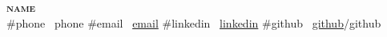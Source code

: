 \begin{center}
    \textbf{\Huge \scshape {{name}}} \\ \vspace{3pt}
    {{#phone}} \ \small {{phone}} 
    {{#email}} \ \href{mailto:{{email}}}{\small {{email}}} 
    {{#linkedin}} \ \href{ {{linkedin}} }{\small {{linkedin}}}  \space
    {{#github}} \ \href{ {{github}} }{\small {{github}}}{{/github}}
\end{center}